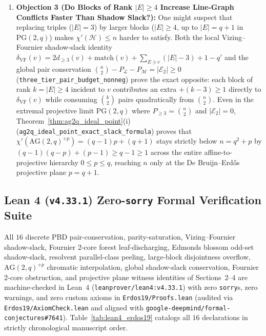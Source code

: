 \documentclass[11pt,reqno]{amsart}
\theoremstyle{definition}
\theoremstyle{remark}
\begin{document}
\begin{enumerate}
  \item \textbf{Objection 3 (Do Blocks of Rank $|E| \ge 4$ Increase Line-Graph Conflicts Faster Than Shadow Slack?):} One might suspect that replacing triples ($|E| = 3$) by larger blocks ($|E| \ge 4$, up to $|E| = q + 1$ in $\mathrm{PG}(2,q)$) makes $\chi'(\mathcal{H}) \le n$ harder to satisfy. Both the local Vizing--Fournier shadow-slack identity $\delta_{\mathrm{VF}}(v) = 2 d_{\ge 3}(v) + \mathrm{match}(v) + \sum_{E \ni v}(|E| - 3) + 1 - q'$ and the global pair conservation $\binom{n}{2} - P_{\mathcal{L}} - P_{\mathcal{M}} = |\mathcal{E}_2| \ge 0$ (\texttt{three\_tier\_pair\_budget\_nonneg}) prove the exact opposite: each block of rank $k = |E| \ge 4$ incident to $v$ contributes an extra $+ (k - 3) \ge 1$ directly to $\delta_{\mathrm{VF}}(v)$ while consuming $\binom{k}{2}$ pairs quadratically from $\binom{n}{2}$. Even in the extremal projective limit $\mathrm{PG}(2,q)$ where $P_{\ge 3} = \binom{n}{2}$ and $|\mathcal{E}_2| = 0$, Theorem~\ref{thm:ag2q_ideal_point}(i) (\texttt{ag2q\_ideal\_point\_exact\_slack\_formula}) proves that $\chi'(\mathrm{AG}(2,q)^{+p}) = (q-1)p + (q+1)$ stays strictly below $n = q^2 + p$ by $(q-1)(q-p) + (p-1) \ge q - 1 \ge 1$ across the entire affine-to-projective hierarchy $0 \le p \le q$, reaching $n$ only at the De Bruijn--Erd\H{o}s projective plane $p = q + 1$.
\end{enumerate}

\subsection{Lean 4 (\texttt{v4.33.1}) Zero-\texttt{sorry} Formal Verification Suite}

All $16$ discrete PBD pair-conservation, parity-saturation, Vizing--Fournier shadow-slack, Fournier 2-core forest leaf-discharging, Edmonds blossom odd-set shadow-slack, resolvent parallel-class peeling, large-block disjointness overflow, $\mathrm{AG}(2,q)^{+p}$ chromatic interpolation, global shadow-slack conservation, Fournier 2-core obstruction, and projective plane witness identities of Sections~2--4 are machine-checked in Lean~4 (\texttt{leanprover/lean4:v4.33.1}) with zero \texttt{sorry}s, zero warnings, and zero custom axioms in \texttt{Erdos19/Proofs.lean} (audited via \texttt{Erdos19/AxiomCheck.lean} and aligned with \texttt{google-deepmind/formal-conjectures\#7641}). Table~\ref{tab:lean4_erdos19} catalogs all $16$ declarations in strictly chronological manuscript order.
\end{document}
